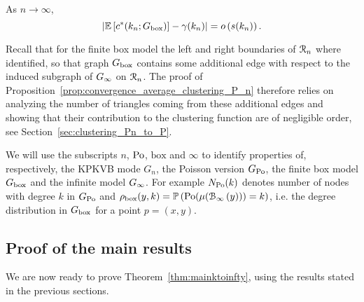 \begin{proposition}\label{prop:convergence_average_clustering_P_n}
As $n \to \infty$,
\[
	\left|\mathbb{E}\left[c^\ast(k_n; G_{\text{box}})\right] - \gamma(k_n)\right| = o\left(s(k_n)\right).
\]
\end{proposition}

Recall that for the finite box model the left and right boundaries of ${\mathcal R}_n$ where identified, so that graph $G_{\text{box}}$ contains some additional edge with respect to the induced subgraph of $G_{\infty}$ on ${\mathcal R}_n$. The proof of Proposition~\ref{prop:convergence_average_clustering_P_n} therefore relies on analyzing the number of triangles coming from these additional edges and showing that their contribution to the clustering function are of negligible order, see Section~\ref{sec:clustering_Pn_to_P}. 

\begin{remark}
We will use the subscripts $n$, ${\mathrm{Po}}$, $\text{box}$ and $\infty$ to identify properties of, respectively, the KPKVB mode $G_n$, the Poisson version $G_{\text{Po}}$, the finite box model $G_{\text{box}}$ and the infinite model $G_{\infty}$. For example $N_{{\mathrm{Po}}}(k)$ denotes number of nodes with degree $k$ in $G_{\text{Po}}$ and $\rho_{\text{box}}(y,k) = \mathbb{P}\left({\mathrm{Po}}(\mu({\mathcal B}_{\infty}\left(y\right))) = k\right)$, i.e. the degree distribution in $G_{\text{box}}$ for a point $p = (x,y)$.
\end{remark}

\subsection{Proof of the main results}\label{ssec:proof_main_result_diverging_k}

We are now ready to prove Theorem~\ref{thm:mainktoinfty}, using the results stated in the previous sections.

